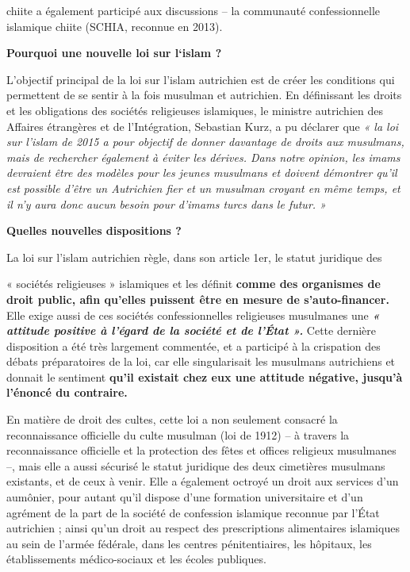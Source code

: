 chiite a également participé aux discussions -- la communauté
confessionnelle islamique chiite (SCHIA, reconnue en 2013).

\textbf{Pourquoi une nouvelle loi sur l`islam ?}

L'objectif principal de la loi sur l'islam autrichien est de créer les
conditions qui permettent de se sentir à la fois musulman et autrichien.
En définissant les droits et les obligations des sociétés religieuses
islamiques, le ministre autrichien des Affaires étrangères et de
l'Intégration, Sebastian Kurz, a pu déclarer que \emph{« la loi sur
l'islam de 2015 a pour objectif de donner davantage de droits aux
musulmans, mais de rechercher également à éviter les dérives. Dans notre
opinion, les imams devraient être des modèles pour les jeunes musulmans
et doivent démontrer qu'il est possible d'être un Autrichien fier et un
musulman croyant en même temps, et il n'y aura donc aucun besoin pour
d'imams turcs dans le futur. »}

\textbf{Quelles nouvelles dispositions ?}

La loi sur l'islam autrichien règle, dans son article 1er, le statut
juridique des

« sociétés religieuses » islamiques et les définit \textbf{comme des
organismes de droit public, afin qu'elles puissent être en mesure de
s'auto-financer.} Elle exige aussi de ces sociétés confessionnelles
religieuses musulmanes une \emph{\textbf{« attitude positive à l'égard
de la société et de l'État ».}} Cette dernière disposition a été très
largement commentée, et a participé à la crispation des débats
préparatoires de la loi, car elle singularisait les musulmans
autrichiens et donnait le sentiment \textbf{qu'il existait chez eux une
attitude négative, jusqu'à l'énoncé du contraire.}

En matière de droit des cultes, cette loi a non seulement consacré la
reconnaissance officielle du culte musulman (loi de 1912) -- à travers
la reconnaissance officielle et la protection des fêtes et offices
religieux musulmanes --, mais elle a aussi sécurisé le statut juridique
des deux cimetières musulmans existants, et de ceux à venir. Elle a
également octroyé un droit aux services d'un aumônier, pour autant qu'il
dispose d'une formation universitaire et d'un agrément de la part de la
société de confession islamique reconnue par l'État autrichien ; ainsi
qu'un droit au respect des prescriptions alimentaires islamiques au sein
de l'armée fédérale, dans les centres pénitentiaires, les hôpitaux, les
établissements médico-sociaux et les écoles publiques.


